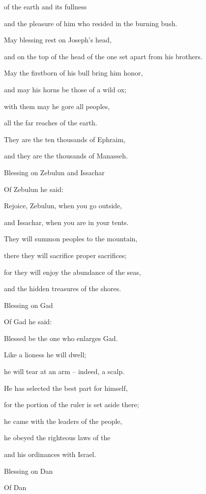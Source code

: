 {of the earth
and its fullness
\par }{\Q and the pleasure
of him who resided
in the burning bush.
\par }{\Q May blessing rest on
Joseph’s
head,
\par }{\Q and on the top of
the head
of the one set apart
from his brothers.
\par }{\Q {}May
the firstborn
of his
bull
bring him honor,
\par }{\Q and may his
horns
be those of a wild ox;
\par }{\Q with
them may he gore
all peoples,
\par }{\Q all the far reaches of the earth.
\par }{\Q They
are the ten thousands
of Ephraim,
\par }{\Q and they
are the thousands
of Manasseh.
\par }{\SH Blessing on Zebulun and Issachar
\par }{\Q {}Of Zebulun
he said:
\par }{\Q Rejoice,
Zebulun,
when
you go outside,
\par }{\Q and Issachar,
when you are in your tents.
\par }{\Q {}They will summon
peoples
to the mountain,
\par }{\Q there
they will sacrifice
proper
sacrifices;
\par }{\Q for
they will enjoy the abundance
of the seas,
\par }{\Q and the hidden treasures of the shores.
\par }{\SH Blessing on Gad
\par }{\Q {}Of Gad
he said:
\par }{\Q Blessed
be the one who enlarges
Gad.
\par }{\Q Like a lioness
he will dwell;
\par }{\Q he will tear
at an arm
– indeed,
a scalp.
\par }{\Q {}He has selected
the best
part for himself,
\par }{\Q for the portion
of the ruler
is set aside
there;
\par }{\Q he came
with the leaders
of the people,
\par }{\Q he obeyed the righteous
laws of the
{}
\par }{\Q and his ordinances
with
Israel.
\par }{\SH Blessing on Dan
\par }{\Q {}Of Dan
}
